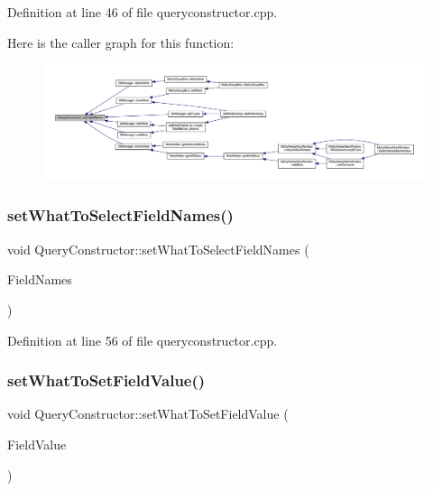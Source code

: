 Definition at line 46 of file queryconstructor.\+cpp.

Here is the caller graph for this function\+:
\nopagebreak
\begin{figure}[H]
\begin{center}
\leavevmode
\includegraphics[width=350pt]{classQueryConstructor_ad1b13fbc7d8c55e384c992852f755008_icgraph}
\end{center}
\end{figure}
\hypertarget{classQueryConstructor_ae9b5ac08342f01185d0ecc941b882a76}{}\label{classQueryConstructor_ae9b5ac08342f01185d0ecc941b882a76} 
\subsubsection{\texorpdfstring{set\+What\+To\+Select\+Field\+Names()}{setWhatToSelectFieldNames()}}
{\footnotesize\ttfamily void Query\+Constructor\+::set\+What\+To\+Select\+Field\+Names (\begin{DoxyParamCaption}\item[{const Q\+String\+List \&}]{Field\+Names }\end{DoxyParamCaption})}



Definition at line 56 of file queryconstructor.\+cpp.

\hypertarget{classQueryConstructor_a969ca6d0c1d258f8a6e6f587f545c2d2}{}\label{classQueryConstructor_a969ca6d0c1d258f8a6e6f587f545c2d2} 
\subsubsection{\texorpdfstring{set\+What\+To\+Set\+Field\+Value()}{setWhatToSetFieldValue()}}
{\footnotesize\ttfamily void Query\+Constructor\+::set\+What\+To\+Set\+Field\+Value (\begin{DoxyParamCaption}\item[{const Q\+Map$<$ Q\+String, Q\+String $>$ \&}]{Field\+Value }\end{DoxyParamCaption})}



